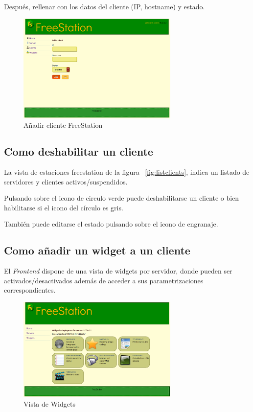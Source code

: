     Después, rellenar con los datos del cliente (IP, hostname) y estado.
    
    \begin{figure}[ht]
        \begin{center}
            \includegraphics[width=300px]{src/img/add-client.png}
            \caption[Añadir cliente FreeStation]
              {Añadir cliente FreeStation}
        \end{center}
    \end{figure}
    
    \subsection{Como deshabilitar un cliente}
    
    La vista de estaciones freestation de la figura  ~\ref{fig:listclients},
    indica un listado de servidores y clientes activos/suspendidos.
    
    Pulsando sobre el icono de circulo verde puede deshabilitarse un cliente o
    bien habilitarse si el icono del círculo es gris.
    
    También puede editarse el estado pulsando sobre el icono de engranaje.
    
    \subsection{Como añadir un widget a un cliente}
    
    El \emph{Frontend} dispone de una vista de widgets por servidor, donde
    pueden ser activados/desactivados además de acceder a sus 
    parametrizaciones correspondientes.
    
    \newpage
    
    \begin{figure}[ht]
        \begin{center}
            \includegraphics[width=300px]{src/img/widget_view.png}
            \caption[Vista de Widgets]
              {Vista de Widgets}
        \end{center}
    \end{figure}
    
